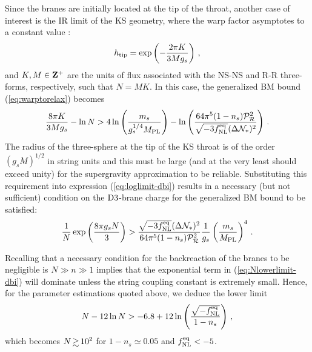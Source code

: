 Since the branes are initially located at the tip of the 
throat, another case of interest is the IR limit of the KS geometry, where 
the warp factor asymptotes to a constant value 
\cite{gkp}:
% 
\begin{equation}
\label{eq:KStip-dbi}
h_{\rm tip} = \exp \left( - \frac{2\pi K}{3Mg_s} \right) \,,
\end{equation}
% 
and $K,M \in {\rm \bf Z^+}$ are the units of flux associated 
with the NS-NS and R-R three-forms, respectively, such that $N=MK$.
In this case, the generalized BM bound (\ref{eq:warptorelax}) becomes
%  
\begin{equation}
\label{eq:loglimit-dbi}
\frac{8\pi K}{3Mg_s} -\ln N > 4 \ln \left( \frac{m_s}{g_s^{1/4}M_{\mathrm{PL}}} \right)
-\ln \left( 
\frac{64\pi^5 (1-n_s)\mathcal{P}_{\mathcal{R}}^2 }{\sqrt{-3f_{\mathrm{NL}}^{\mathrm{eq}}} ( \Delta \mathcal{N}_*)^2}
\right) \,.
\end{equation}
% 
The radius of the three-sphere at the tip of the KS 
throat is of the order $(g_sM)^{1/2}$ in string units 
and this must be large (and at the very least should exceed
unity) for the supergravity approximation to be reliable. 
Substituting this requirement into expression (\ref{eq:loglimit-dbi}) 
results in a necessary (but not sufficient) condition 
on the ${\rm D3}$-brane charge for the 
generalized BM bound to be satisfied:
%  
\begin{equation}
\label{eq:Nlowerlimit-dbi}
\frac{1}{N} \exp \left( \frac{8\pi g_s N}{3}  \right)
> \frac{\sqrt{-3f_{\mathrm{NL}}^{\mathrm{eq}}} ( \Delta \mathcal{N}_*)^2}{64\pi^5 
(1-n_s)\mathcal{P}_{\mathcal{R}}^2 } \frac{1}{g_s} \left( \frac{m_s}{M_{\mathrm{PL}}} \right)^4 \,.
\end{equation}
% 


Recalling that a necessary condition for the backreaction 
of the branes to be negligible is 
$N \gg n \gg 1$ implies that the 
exponential term in (\ref{eq:Nlowerlimit-dbi}) will dominate unless 
the string coupling constant is extremely small. Hence, for 
the parameter estimations quoted above, we 
deduce the lower limit 
% 
\begin{equation}
\label{eq:Nconstraint-dbi}
N- 12 \ln N > -6.8 +12 \ln \left( \frac{\sqrt{-f_{\mathrm{NL}}^{\mathrm{eq}}}}{1-n_s} \right) \,,
\end{equation}
% 
which becomes $N \, \gsim \, 10^2$ for $1-n_s \simeq 0.05$ and $f_{\mathrm{NL}}^{\mathrm{eq}}<-5$.


